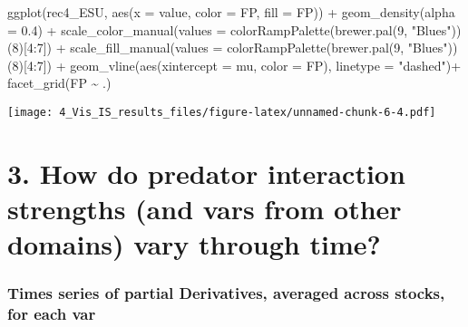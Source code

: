 \documentclass[
]{article}
\newenvironment{Shaded}{\begin{snugshade}}{\end{snugshade}}
\newcommand{\AttributeTok}[1]{\textcolor[rgb]{0.77,0.63,0.00}{#1}}
\newcommand{\DecValTok}[1]{\textcolor[rgb]{0.00,0.00,0.81}{#1}}
\newcommand{\FloatTok}[1]{\textcolor[rgb]{0.00,0.00,0.81}{#1}}
\newcommand{\FunctionTok}[1]{\textcolor[rgb]{0.00,0.00,0.00}{#1}}
\newcommand{\NormalTok}[1]{#1}
\newcommand{\SpecialCharTok}[1]{\textcolor[rgb]{0.00,0.00,0.00}{#1}}
\newcommand{\StringTok}[1]{\textcolor[rgb]{0.31,0.60,0.02}{#1}}
\begin{document}
\begin{Shaded}
\begin{Highlighting}[]
\FunctionTok{ggplot}\NormalTok{(rec4\_ESU, }\FunctionTok{aes}\NormalTok{(}\AttributeTok{x =}\NormalTok{ value, }\AttributeTok{color =}\NormalTok{ FP, }\AttributeTok{fill =}\NormalTok{ FP)) }\SpecialCharTok{+}
  \FunctionTok{geom\_density}\NormalTok{(}\AttributeTok{alpha =} \FloatTok{0.4}\NormalTok{) }\SpecialCharTok{+}
  \FunctionTok{scale\_color\_manual}\NormalTok{(}\AttributeTok{values =} \FunctionTok{colorRampPalette}\NormalTok{(}\FunctionTok{brewer.pal}\NormalTok{(}\DecValTok{9}\NormalTok{, }\StringTok{"Blues"}\NormalTok{))(}\DecValTok{8}\NormalTok{)[}\DecValTok{4}\SpecialCharTok{:}\DecValTok{7}\NormalTok{]) }\SpecialCharTok{+}
  \FunctionTok{scale\_fill\_manual}\NormalTok{(}\AttributeTok{values =} \FunctionTok{colorRampPalette}\NormalTok{(}\FunctionTok{brewer.pal}\NormalTok{(}\DecValTok{9}\NormalTok{, }\StringTok{"Blues"}\NormalTok{))(}\DecValTok{8}\NormalTok{)[}\DecValTok{4}\SpecialCharTok{:}\DecValTok{7}\NormalTok{]) }\SpecialCharTok{+}
    \FunctionTok{geom\_vline}\NormalTok{(}\FunctionTok{aes}\NormalTok{(}\AttributeTok{xintercept =}\NormalTok{ mu, }\AttributeTok{color =}\NormalTok{ FP),}
             \AttributeTok{linetype =} \StringTok{"dashed"}\NormalTok{)}\SpecialCharTok{+} 
  \FunctionTok{facet\_grid}\NormalTok{(FP }\SpecialCharTok{\textasciitilde{}}\NormalTok{ .)}
\end{Highlighting}
\end{Shaded}

\texttt{[image: 4\_Vis\_IS\_results\_files/figure-latex/unnamed-chunk-6-4.pdf]}

\hypertarget{how-do-predator-interaction-strengths-and-vars-from-other-domains-vary-through-time}{%
\section{3. How do predator interaction strengths (and vars from other
domains) vary through
time?}\label{how-do-predator-interaction-strengths-and-vars-from-other-domains-vary-through-time}}

\hypertarget{times-series-of-partial-derivatives-averaged-across-stocks-for-each-var}{%
\subsubsection{Times series of partial Derivatives, averaged across
stocks, for each
var}\label{times-series-of-partial-derivatives-averaged-across-stocks-for-each-var}}
\end{document}
